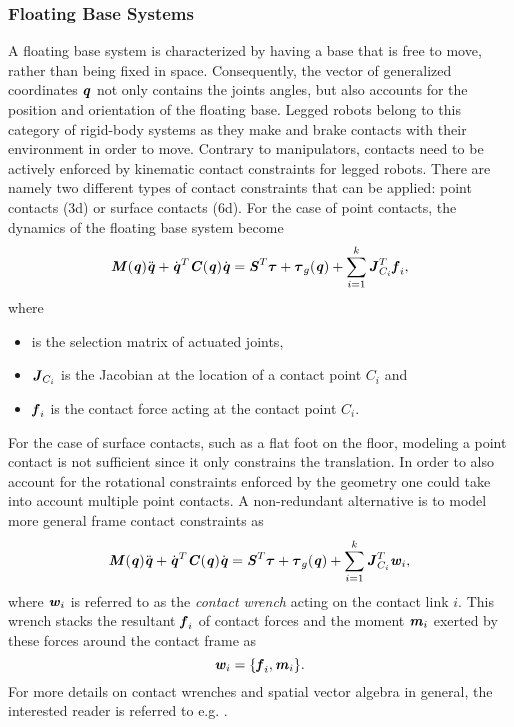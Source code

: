 \subsubsection{Floating Base Systems}
A floating base system is characterized by having a base that is free to move, rather than being fixed in space. Consequently, the vector of generalized coordinates $\bm{\mathit{q}}$ not only contains the joints angles, but also accounts for the position and orientation of the floating base. Legged robots belong to this category of rigid-body systems as they make and brake contacts with their environment in order to move. Contrary to manipulators, contacts need to be actively enforced by kinematic contact constraints for legged robots. There are namely two different types of contact constraints that can be applied: point contacts (3d) or surface contacts (6d). 
For the case of point contacts, the dynamics of the floating base system become
\begin{equation*} \label{eqn:EoMLeggedRobotPtContact}
\bm{\mathit{M}}(\bm{\mathit{q}})\ddot{\bm{\mathit{q}}}+\dot{\bm{\mathit{q}}}^T\bm{\mathit{C}}(\bm{\mathit{q}})\dot{\bm{\mathit{q}}}=\bm{\mathit{S}}^T\bm{\mathit{\tau}}+\bm{\mathit{\tau}}_g(\bm{\mathit{q}})+\sum_{i=1}^{k}\bm{\mathit{J}}_{C_i}^T\bm{\mathit{f}}_i,
\end{equation*}
where 
\begin{itemize}
\item {} is the selection matrix of actuated joints,
\item $\bm{\mathit{J}}_{C_i}$ is the Jacobian at the location of a contact point $C_i$ and
\item $\bm{\mathit{f}}_i$ is the contact force acting at the contact point $C_i$.
\end{itemize}
For the case of surface contacts, such as a flat foot on the floor, modeling a point contact is not sufficient since it only constrains the translation. In order to also account for the rotational constraints enforced by the geometry one could take into account multiple point contacts. A non-redundant alternative is to model more general frame contact constraints as
\begin{equation*} \label{eqn:EoMLeggedRobotSurfaceContact}
\bm{\mathit{M}}(\bm{\mathit{q}})\ddot{\bm{\mathit{q}}}+\dot{\bm{\mathit{q}}}^T\bm{\mathit{C}}(\bm{\mathit{q}})\dot{\bm{\mathit{q}}}=\bm{\mathit{S}}^T\bm{\mathit{\tau}}+\bm{\mathit{\tau}}_g(\bm{\mathit{q}})+\sum_{i=1}^{k}\bm{\mathit{J}}_{C_i}^T\bm{\mathit{w}}_i,
\end{equation*}
where $\bm{\mathit{w}}_i$ is referred to as the \textit{contact wrench} acting on the contact link $i$. This wrench stacks the resultant $\bm{\mathit{f}}_i$ of contact forces and the moment $\bm{\mathit{m}}_i$ exerted by these forces around the contact frame as
$$\bm{\mathit{w}}_i=\{\bm{\mathit{f}}_i,\bm{\mathit{m}}_i\}.$$ 
For more details on contact wrenches and spatial vector algebra in general, the interested reader is referred to e.g. \cite[Ch.2]{featherstone2014rigid}.

